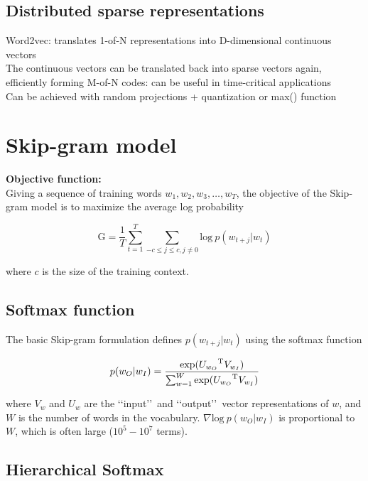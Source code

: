 \subsection{Distributed sparse representations}
Word2vec: translates 1-of-N representations into D-dimensional continuous vectors\\

The continuous vectors can be translated back into sparse vectors again, efficiently forming M-of-N codes: can be useful in time-critical applications\\

Can be achieved with random projections + quantization or max() function\\



\section{Skip-gram model}


\textbf{Objective function:}\\

Giving a sequence of training words $w_1,w_2,w_3,\ldots,w_T$, the objective of the Skip-gram model is to maximize the average log probability 

$$\mathrm{G}=\frac{1}{T}\sum_{t=1}^T\sum_{-c\leq j\leq c,j\neq0}\mathrm{log}\ p(w_{t+j}|w_t)$$ 

where $c$ is the size of the training context. \\

\subsection{Softmax function}

The basic Skip-gram formulation defines $p(w_{t+j}|w_t)$ using the softmax function 

$$p(w_O|w_I)=\frac{\mathrm{exp}({U_{w_O}}^{\rm T}V_{w_I})}{\sum_{w=1}^W\mathrm{exp}({U_{w_O}}^{\rm T}V_{w_I})}$$ 

where $V_w$ and $U_w$ are the \lq\lq input\rq\rq\ and \lq\lq output\rq\rq\ vector representations of $w$, and $W$ is the number of words in the vocabulary.
$\nabla\mathrm{log}\ p(w_O|w_I)$ is proportional to $W$, which is often large ($10^5-10^7$ terms).\\

\subsection{Hierarchical Softmax}

